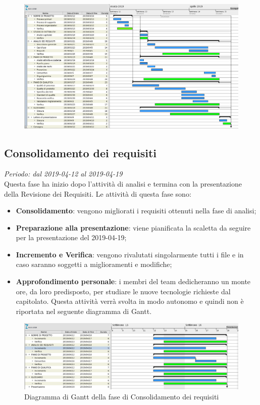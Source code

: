 \begin{figure}[H]
	\includegraphics[width=0.99\linewidth]{res/images/gantt_analisi.png}
	
\end{figure}


\subsection{Consolidamento dei requisiti}
\textit{Periodo: dal 2019-04-12 al 2019-04-19} \\
Questa fase ha inizio dopo l'attività di analisi e termina con la presentazione della Revisione dei Requisiti. Le attività 
di questa fase sono:
\begin{itemize}
	\item \textbf{Consolidamento}: vengono migliorati i requisiti ottenuti nella fase di analisi;
	\item \textbf{Preparazione alla presentazione}: viene pianificata la scaletta da seguire per la presentazione del 2019-04-19;
	\item \textbf{Incremento e Verifica}: vengono rivalutati singolarmente tutti i file e in caso saranno soggetti a miglioramenti e modifiche;
	\item \textbf{Approfondimento personale}: i membri del team dedicheranno un monte ore, da loro predisposto, per studiare le nuove tecnologie richieste dal capitolato\glo. Questa attività verrà svolta in modo autonomo e quindi non è riportata nel seguente diagramma di Gantt\glo.
\end{itemize}

\begin{figure}[H]
	\includegraphics[width=0.99\linewidth]{res/images/gantt_cons.png}
	\caption{Diagramma di Gantt della fase di Consolidamento dei requisiti}
\end{figure}

